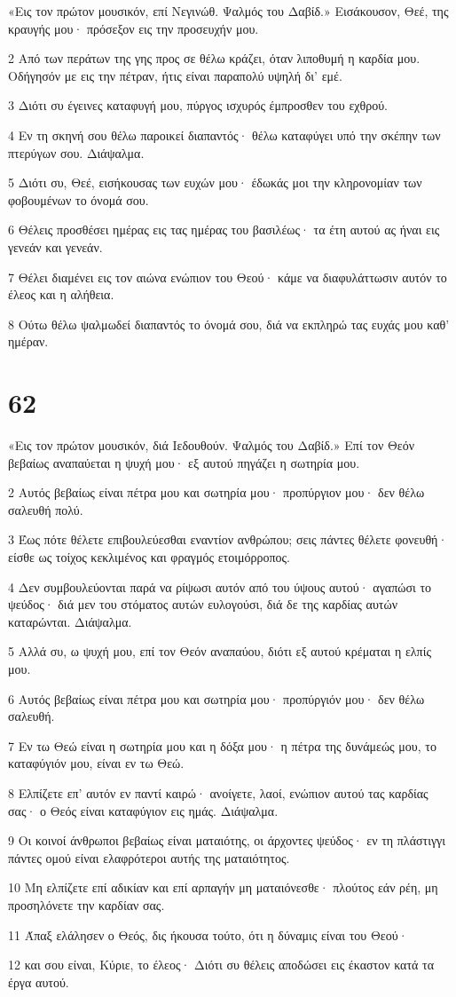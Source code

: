 \par «Εις τον πρώτον μουσικόν, επί Νεγινώθ. Ψαλμός του Δαβίδ.» Εισάκουσον, Θεέ, της κραυγής μου· πρόσεξον εις την προσευχήν μου.
\par 2 Από των περάτων της γης προς σε θέλω κράζει, όταν λιποθυμή η καρδία μου. Οδήγησόν με εις την πέτραν, ήτις είναι παραπολύ υψηλή δι' εμέ.
\par 3 Διότι συ έγεινες καταφυγή μου, πύργος ισχυρός έμπροσθεν του εχθρού.
\par 4 Εν τη σκηνή σου θέλω παροικεί διαπαντός· θέλω καταφύγει υπό την σκέπην των πτερύγων σου. Διάψαλμα.
\par 5 Διότι συ, Θεέ, εισήκουσας των ευχών μου· έδωκάς μοι την κληρονομίαν των φοβουμένων το όνομά σου.
\par 6 Θέλεις προσθέσει ημέρας εις τας ημέρας του βασιλέως· τα έτη αυτού ας ήναι εις γενεάν και γενεάν.
\par 7 Θέλει διαμένει εις τον αιώνα ενώπιον του Θεού· κάμε να διαφυλάττωσιν αυτόν το έλεος και η αλήθεια.
\par 8 Ούτω θέλω ψαλμωδεί διαπαντός το όνομά σου, διά να εκπληρώ τας ευχάς μου καθ' ημέραν.

\chapter{62}

\par «Εις τον πρώτον μουσικόν, διά Ιεδουθούν. Ψαλμός του Δαβίδ.» Επί τον Θεόν βεβαίως αναπαύεται η ψυχή μου· εξ αυτού πηγάζει η σωτηρία μου.
\par 2 Αυτός βεβαίως είναι πέτρα μου και σωτηρία μου· προπύργιον μου· δεν θέλω σαλευθή πολύ.
\par 3 Έως πότε θέλετε επιβουλεύεσθαι εναντίον ανθρώπου; σεις πάντες θέλετε φονευθή· είσθε ως τοίχος κεκλιμένος και φραγμός ετοιμόρροπος.
\par 4 Δεν συμβουλεύονται παρά να ρίψωσι αυτόν από του ύψους αυτού· αγαπώσι το ψεύδος· διά μεν του στόματος αυτών ευλογούσι, διά δε της καρδίας αυτών καταρώνται. Διάψαλμα.
\par 5 Αλλά συ, ω ψυχή μου, επί τον Θεόν αναπαύου, διότι εξ αυτού κρέμαται η ελπίς μου.
\par 6 Αυτός βεβαίως είναι πέτρα μου και σωτηρία μου· προπύργιόν μου· δεν θέλω σαλευθή.
\par 7 Εν τω Θεώ είναι η σωτηρία μου και η δόξα μου· η πέτρα της δυνάμεώς μου, το καταφύγιόν μου, είναι εν τω Θεώ.
\par 8 Ελπίζετε επ' αυτόν εν παντί καιρώ· ανοίγετε, λαοί, ενώπιον αυτού τας καρδίας σας· ο Θεός είναι καταφύγιον εις ημάς. Διάψαλμα.
\par 9 Οι κοινοί άνθρωποι βεβαίως είναι ματαιότης, οι άρχοντες ψεύδος· εν τη πλάστιγγι πάντες ομού είναι ελαφρότεροι αυτής της ματαιότητος.
\par 10 Μη ελπίζετε επί αδικίαν και επί αρπαγήν μη ματαιόνεσθε· πλούτος εάν ρέη, μη προσηλόνετε την καρδίαν σας.
\par 11 Άπαξ ελάλησεν ο Θεός, δις ήκουσα τούτο, ότι η δύναμις είναι του Θεού·
\par 12 και σου είναι, Κύριε, το έλεος· Διότι συ θέλεις αποδώσει εις έκαστον κατά τα έργα αυτού.

